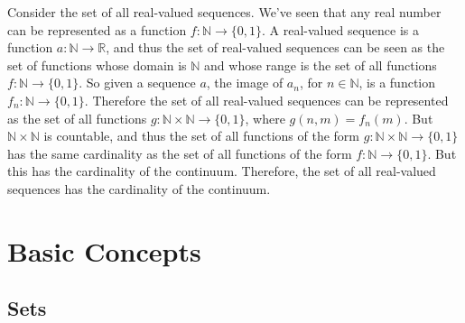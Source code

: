         \begin{lexample}
            Consider the set of all real-valued sequences. We've seen
            that any real number can be represented as a function
            $f:\mathbb{N}\rightarrow\{0,1\}$. A real-valued sequence
            is a function $a:\mathbb{N}\rightarrow\mathbb{R}$, and
            thus the set of real-valued sequences can be seen as the
            set of functions whose domain is $\mathbb{N}$ and whose
            range is the set of all functions
            $f:\mathbb{N}\rightarrow\{0,1\}$. So given a sequence
            $a$, the image of $a_{n}$, for $n\in\mathbb{N}$, is a
            function $f_{n}:\mathbb{N}\rightarrow\{0,1\}$. Therefore
            the set of all real-valued sequences can be represented
            as the set of all functions
            $g:\mathbb{N}\times\mathbb{N}\rightarrow\{0,1\}$, where
            $g(n,m)=f_{n}(m)$. But $\mathbb{N}\times\mathbb{N}$ is
            countable, and thus the set of all functions of the form
            $g:\mathbb{N}\times\mathbb{N}\rightarrow\{0,1\}$ has the
            same cardinality as the set of all functions of the form
            $f:\mathbb{N}\rightarrow\{0,1\}$. But this has the
            cardinality of the continuum. Therefore, the set of all
            real-valued sequences has the cardinality of the continuum.
        \end{lexample}
\section{Basic Concepts}
    \subsection{Sets}
